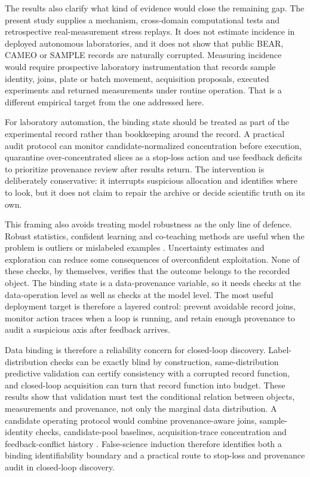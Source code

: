 The results also clarify what kind of evidence would close the remaining gap. The present study supplies a mechanism, cross-domain computational tests and retrospective real-measurement stress replays. It does not estimate incidence in deployed autonomous laboratories, and it does not show that public BEAR, CAMEO or SAMPLE records are naturally corrupted. Measuring incidence would require prospective laboratory instrumentation that records sample identity, joins, plate or batch movement, acquisition proposals, executed experiments and returned measurements under routine operation. That is a different empirical target from the one addressed here.

For laboratory automation, the binding state should be treated as part of the experimental record rather than bookkeeping around the record. A practical audit protocol can monitor candidate-normalized concentration before execution, quarantine over-concentrated slices as a stop-loss action and use feedback deficits to prioritize provenance review after results return. The intervention is deliberately conservative: it interrupts suspicious allocation and identifies where to look, but it does not claim to repair the archive or decide scientific truth on its own.

This framing also avoids treating model robustness as the only line of defence. Robust statistics, confident learning and co-teaching methods are useful when the problem is outliers or mislabeled examples \citep{huber1981robuststatistics,northcutt2021confident,han2018coteaching}. Uncertainty estimates and exploration can reduce some consequences of overconfident exploitation. None of these checks, by themselves, verifies that the outcome belongs to the recorded object. The binding state is a data-provenance variable, so it needs checks at the data-operation level as well as checks at the model level. The most useful deployment target is therefore a layered control: prevent avoidable record joins, monitor action traces when a loop is running, and retain enough provenance to audit a suspicious axis after feedback arrives.

Data binding is therefore a reliability concern for closed-loop discovery. Label-distribution checks can be exactly blind by construction, same-distribution predictive validation can certify consistency with a corrupted record function, and closed-loop acquisition can turn that record function into budget. These results show that validation must test the conditional relation between objects, measurements and provenance, not only the marginal data distribution. A candidate operating protocol would combine provenance-aware joins, sample-identity checks, candidate-pool baselines, acquisition-trace concentration and feedback-conflict history \citep{w3c2013provdm,herschel2017provenance,gebru2021datasheets,sambasivan2021datacascades}. False-science induction therefore identifies both a binding identifiability boundary and a practical route to stop-loss and provenance audit in closed-loop discovery.
